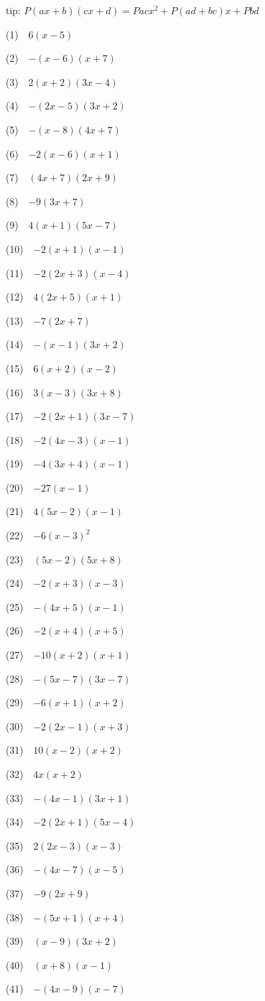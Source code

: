 \documentclass[a4j,twocolumn,10pt,fleqn]{jarticle}
\begin{document}
tip: $P(ax + b)(cx + d) = Pacx^2 + P(ad + bc)x + Pbd$

(1)~~$6(x-5)$

(2)~~$-(x-6)(x+7)$

(3)~~$2(x+2)(3x-4)$

(4)~~$-(2x-5)(3x+2)$

(5)~~$-(x-8)(4x+7)$

(6)~~$-2(x-6)(x+1)$

(7)~~$(4x+7)(2x+9)$

(8)~~$-9(3x+7)$

(9)~~$4(x+1)(5x-7)$

(10)~~$-2(x+1)(x-1)$

(11)~~$-2(2x+3)(x-4)$

(12)~~$4(2x+5)(x+1)$

(13)~~$-7(2x+7)$

(14)~~$-(x-1)(3x+2)$

(15)~~$6(x+2)(x-2)$

(16)~~$3(x-3)(3x+8)$

(17)~~$-2(2x+1)(3x-7)$

(18)~~$-2(4x-3)(x-1)$

(19)~~$-4(3x+4)(x-1)$

(20)~~$-27(x-1)$

(21)~~$4(5x-2)(x-1)$

(22)~~$-6(x-3)^2$

(23)~~$(5x-2)(5x+8)$

(24)~~$-2(x+3)(x-3)$

(25)~~$-(4x+5)(x-1)$

(26)~~$-2(x+4)(x+5)$

(27)~~$-10(x+2)(x+1)$

(28)~~$-(5x-7)(3x-7)$

(29)~~$-6(x+1)(x+2)$

(30)~~$-2(2x-1)(x+3)$

(31)~~$10(x-2)(x+2)$

(32)~~$4x(x+2)$

(33)~~$-(4x-1)(3x+1)$

(34)~~$-2(2x+1)(5x-4)$

(35)~~$2(2x-3)(x-3)$

(36)~~$-(4x-7)(x-5)$

(37)~~$-9(2x+9)$

(38)~~$-(5x+1)(x+4)$

(39)~~$(x-9)(3x+2)$

(40)~~$(x+8)(x-1)$

(41)~~$-(4x-9)(x-7)$
\end{document}
